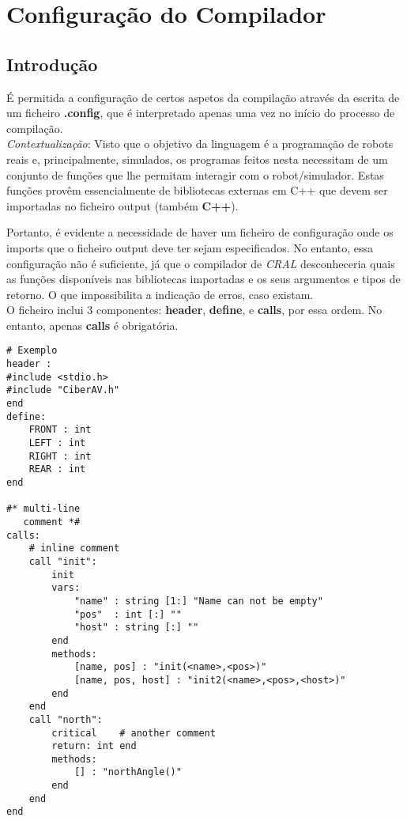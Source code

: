 \documentclass{report}
\begin{document}
\chapter{Configuração do Compilador}
\label{chap.config}
\section{Introdução}

É permitida a configuração de certos aspetos da compilação através da escrita de um ficheiro \textbf{.config}, que é interpretado apenas uma vez no início do processo de compilação.\\

\textit{Contextualização}: Visto que o objetivo da linguagem é a programação de robots reais e, principalmente, simulados, os programas feitos nesta necessitam de um conjunto de funções que lhe permitam interagir com o robot/simulador. Estas funções provêm essencialmente de bibliotecas externas em C++ que devem ser importadas no ficheiro output (também \textbf{C++}).

Portanto, é evidente a necessidade de haver um ficheiro de configuração onde os imports que o ficheiro output deve ter sejam especificados.
No entanto, essa configuração não é suficiente, já que o compilador de \textit{CRAL} desconheceria quais as funções disponíveis nas bibliotecas importadas e os seus argumentos e tipos de retorno. O que impossibilita a indicação de erros, caso existam.\\

O ficheiro inclui 3 componentes: \textbf{header}, \textbf{define}, e \textbf{calls}, por essa ordem. No entanto, apenas \textbf{calls} é obrigatória.
\begin{verbatim}
# Exemplo
header :
#include <stdio.h>
#include "CiberAV.h"
end
define:
    FRONT : int
    LEFT : int
    RIGHT : int
    REAR : int
end

#* multi-line
   comment *#
calls:
    # inline comment
    call "init":
        init
        vars:
            "name" : string [1:] "Name can not be empty"
            "pos"  : int [:] ""
            "host" : string [:] ""
        end
        methods:
            [name, pos] : "init(<name>,<pos>)"
            [name, pos, host] : "init2(<name>,<pos>,<host>)"
        end
    end
    call "north":
        critical    # another comment
        return: int end
        methods:
            [] : "northAngle()"
        end
    end
end
\end{verbatim}
\end{document}
